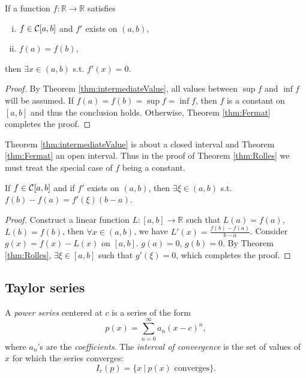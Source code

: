 \begin{thm}[Rolle's]
  \label{thm:Rolles}
  If a function $f:\mathbb{R}\rightarrow\mathbb{R}$
   satisfies
   \begin{enumerate}[(i)]\itemsep0em
   \item $f\in {\cal C}[a,b]$ and $f'$ exists on $(a,b)$,
   \item $f(a)=f(b)$,
   \end{enumerate}
  then $\exists x\in (a,b)$ s.t. $f'(x)=0$.
\end{thm}
\begin{proof}
  By Theorem \ref{thm:intermediateValue},
   all values between $\sup f$ and $\inf f$
   will be assumed.
  If $f(a)=f(b)=\sup f=\inf f$,
   then $f$ is a constant on $[a,b]$
   and thus the conclusion holds.
  Otherwise, Theorem \ref{thm:Fermat} completes the proof.
\end{proof}

\begin{rem}
Theorem \ref{thm:intermediateValue} is about a closed interval
 and Theorem \ref{thm:Fermat} an open interval.
Thus in the proof of Theorem \ref{thm:Rolles}
 we must treat the special case of $f$ being a constant.
\end{rem}

\begin{thm}
  \label{thm:meanValue}
  If $f\in {\cal C}[a,b]$ and if $f'$ exists on $(a,b)$,
  then $\exists \xi\in(a,b)$
  s.t. $f(b)-f(a)=f'(\xi)(b-a)$.
\end{thm}
\begin{proof}
  Construct a linear function
   $L:[a,b]\rightarrow\mathbb{R}$ such that
   $L(a)=f(a)$, $L(b)=f(b)$,
   then $\forall x\in (a,b)$,
   we have $L'(x)=\frac{f(b)-f(a)}{b-a}$.
  Consider $g(x)=f(x)-L(x)$ on $[a,b]$.
   $g(a)=0$, $g(b)=0$.
  By Theorem \ref{thm:Rolles}, $\exists \xi\in[a,b]$
   such that $g'(\xi)=0$,
   which completes the proof.
\end{proof}


\subsection{Taylor series}
\label{sec:Taylorseries}

\begin{defn}
  \label{def:powerSeries}
  A \emph{power series} centered at $c$
   is a series of the form
   \begin{equation}
     \label{eq:powerSeries}
     p(x)=\sum_{n=0}^{\infty} a_n (x-c)^n,
   \end{equation}
   where $a_n$'s are the \emph{coefficients}.
  The \emph{interval of convergence}
   is the set of values of $x$ for which the series converges:
   \begin{equation}
     \label{eq:intervalOfConvergence}
     I_c(p) = \{x\ |\ p(x) \text{ converges} \}.
   \end{equation}
\end{defn}

